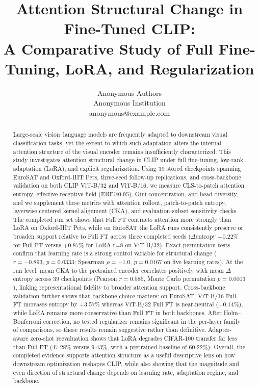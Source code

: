 \documentclass[10pt]{article}
\title{Attention Structural Change in Fine-Tuned CLIP:\\A Comparative Study of Full Fine-Tuning, LoRA, and Regularization}
\author{\name Anonymous Authors \\
\addr Anonymous Institution \\
\email anonymous@example.com}
\begin{document}
\maketitle

\begin{abstract}
Large-scale vision--language models are frequently adapted to downstream visual classification tasks, yet the extent to which such adaptation alters the internal attention structure of the visual encoder remains insufficiently characterized. This study investigates attention structural change in CLIP under full fine-tuning, low-rank adaptation (LoRA), and explicit regularization. Using 39 stored checkpoints spanning EuroSAT and Oxford-IIIT Pets, three-seed follow-up replications, and cross-backbone validation on both CLIP ViT-B/32 and ViT-B/16, we measure CLS-to-patch attention entropy, effective receptive field (ERF@0.95), Gini concentration, and head diversity, and we supplement these metrics with attention rollout, patch-to-patch entropy, layerwise centered kernel alignment (CKA), and evaluation-subset sensitivity checks. The completed run set shows that Full FT contracts attention more strongly than LoRA on Oxford-IIIT Pets, while on EuroSAT the LoRA runs consistently preserve or broaden support relative to Full FT across three completed seeds ($\Delta$entropy $-0.22\%$ for Full FT versus $+0.87\%$ for LoRA r=8 on ViT-B/32). Exact permutation tests confirm that learning rate is a strong control variable for structural change ($r=-0.893$, $p=0.0333$; Spearman $\rho=-1.0$, $p=0.0167$ on five learning rates). At the run level, mean CKA to the pretrained encoder correlates positively with mean $\Delta$entropy across 39 checkpoints (Pearson $r=0.585$, Monte Carlo permutation $p=0.0003$), linking representational fidelity to broader attention support. Cross-backbone validation further shows that backbone choice matters: on EuroSAT, ViT-B/16 Full FT increases entropy by $+3.57\%$ whereas ViT-B/32 Full FT is near-neutral ($-0.14\%$), while LoRA remains more conservative than Full FT in both backbones. After Holm--Bonferroni correction, no tested regularizer remains significant in the per-layer family of comparisons, so those results remain suggestive rather than definitive. Adapter-aware zero-shot reevaluation shows that LoRA degrades CIFAR-100 transfer far less than Full FT (47.28\% versus 9.43\%, with a pretrained baseline of 60.22\%). Overall, the completed evidence supports attention structure as a useful descriptive lens on how downstream optimization reshapes CLIP, while also showing that the magnitude and even direction of structural change depends on learning rate, adaptation regime, and backbone.
\end{abstract}
\end{document}
